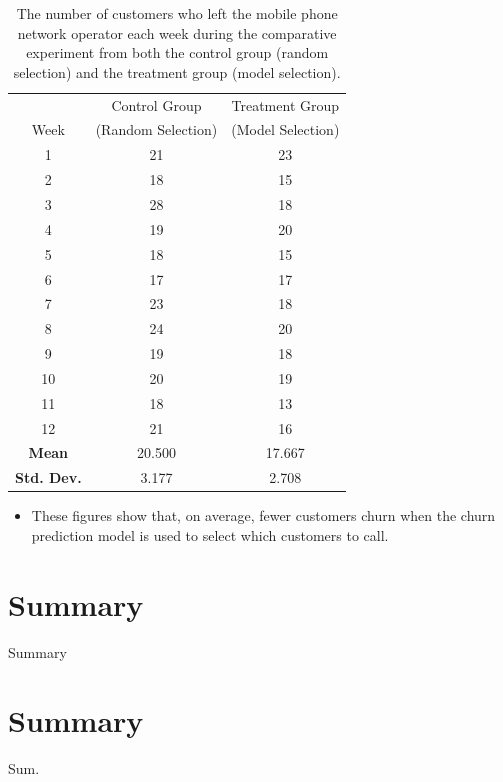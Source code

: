 \documentclass[xcolor={table}]{beamer}
\newcommand{\SectionSlideShortHeader}[3][]{
	\ifthenelse{\isempty{#1}}
		{\section[#3]{#2}\begin{frame} \begin{center}\begin{huge}#2\end{huge}\end{center}\end{frame}}
		{\section[#1]{#2}\begin{frame} \begin{center}\begin{huge}#3\end{huge}\end{center}\end{frame}}
}
\begin{document}
 \begin{frame} [plain]
\begin{table}
	\caption{The number of customers who left the mobile phone network operator each week during the comparative experiment from both the control group (random selection) and the treatment group (model selection).}
\label{tab:controlGroupExample}
	\centering
	\begin{footnotesize}
		\begin{tabular}[ht]{c c c}  
				\hline
					&	Control Group	&	Treatment Group	\\
				Week	&	(Random Selection)	&	(Model Selection)	\\
				\hline
1	&	21	&	23	\\
2	&	18	&	15	\\
3	&	28	&	18	\\
4	&	19	&	20	\\
5	&	18	&	15	\\
6	&	17	&	17	\\
7	&	23	&	18	\\
8	&	24	&	20	\\
9	&	19	&	18	\\
10	&	20	&	19	\\
11	&	18	&	13	\\
12	&	21	&	16	\\
				\hline
\textbf{Mean}		& 	20.500	&	17.667 \\
\textbf{Std. Dev.}		& 3.177		&	2.708 \\
				\hline
			\end{tabular}
				\end{footnotesize}
\end{table}
\end{frame} 

\begin{frame}
	\begin{itemize}
		\item These figures show that, on average, fewer customers churn when the churn prediction model is used to select which customers to call.
	\end{itemize}
\end{frame}

\SectionSlideShortHeader{Summary}{Sum.}

\begin{frame}[plain]
	\begin{scriptsize}
	\vspace{0.25cm}
	\tableofcontents
	\end{scriptsize}
\end{frame}
\end{document}
